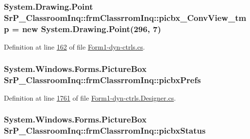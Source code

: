 \hypertarget{class_sr_p___classroom_inq_1_1frm_classrrom_inq_ae49fd425a3c4f52d94af6c20b67f6126}{
\subsubsection[{picbx\-\_\-\-Conv\-View\-\_\-tmp}]{\setlength{\rightskip}{0pt plus 5cm}\-System.\-Drawing.\-Point {\bf \-Sr\-P\-\_\-\-Classroom\-Inq\-::frm\-Classrrom\-Inq\-::picbx\-\_\-\-Conv\-View\-\_\-tmp} = new \-System.\-Drawing.\-Point(296, 7)}}
\label{class_sr_p___classroom_inq_1_1frm_classrrom_inq_ae49fd425a3c4f52d94af6c20b67f6126}


\-Definition at line \hyperlink{_form1-dyn-ctrls_8cs_source_l00162}{162} of file \hyperlink{_form1-dyn-ctrls_8cs_source}{\-Form1-\/dyn-\/ctrls.\-cs}.

\hypertarget{class_sr_p___classroom_inq_1_1frm_classrrom_inq_ad71fe1b1dd90eb59594ecf4a175e1b03}{
\subsubsection[{picbx\-Prefs}]{\setlength{\rightskip}{0pt plus 5cm}\-System.\-Windows.\-Forms.\-Picture\-Box {\bf \-Sr\-P\-\_\-\-Classroom\-Inq\-::frm\-Classrrom\-Inq\-::picbx\-Prefs}}}
\label{class_sr_p___classroom_inq_1_1frm_classrrom_inq_ad71fe1b1dd90eb59594ecf4a175e1b03}


\-Definition at line \hyperlink{_form1-dyn-ctrls_8_designer_8cs_source_l01761}{1761} of file \hyperlink{_form1-dyn-ctrls_8_designer_8cs_source}{\-Form1-\/dyn-\/ctrls.\-Designer.\-cs}.

\hypertarget{class_sr_p___classroom_inq_1_1frm_classrrom_inq_a5252272b4880f9a8d5ecf8fcd1828873}{
\subsubsection[{picbx\-Status}]{\setlength{\rightskip}{0pt plus 5cm}\-System.\-Windows.\-Forms.\-Picture\-Box {\bf \-Sr\-P\-\_\-\-Classroom\-Inq\-::frm\-Classrrom\-Inq\-::picbx\-Status}}}
\label{class_sr_p___classroom_inq_1_1frm_classrrom_inq_a5252272b4880f9a8d5ecf8fcd1828873}



